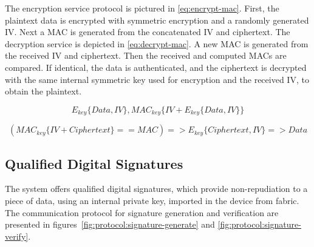 The encryption service protocol is pictured in \ref{eq:encrypt-mac}.
First, the plaintext data is encrypted with symmetric encryption and a randomly generated IV. Next a MAC is generated from the concatenated IV and ciphertext.
The decryption service is depicted in \ref{eq:decrypt-mac}.
A new MAC is generated from the received IV and ciphertext. Then the received and computed MACs are compared. If identical, the data is authenticated, and the ciphertext is decrypted with the same internal symmetric key used for encryption and the received IV, to obtain the plaintext.

\begin{equation}
	\label{eq:encrypt-mac}
	E_{key}\{Data, IV\}, MAC_{key}\{IV+E_{key}\{Data, IV\}\}
\end{equation}

\begin{equation}
	\label{eq:decrypt-mac}
	(MAC_{key}\{IV+Ciphertext\} == MAC) => E_{key}\{Ciphertext, IV\} => Data
\end{equation}


\subsection{Qualified Digital Signatures}\label{chap:arch:services:signatures}

The system offers qualified digital signatures, which provide non-repudiation to a piece of data, using an internal private key, imported in the device from fabric.
The communication protocol for signature generation and verification are presented in figures~\ref{fig:protocol:signature-generate} and \ref{fig:protocol:signature-verify}.

